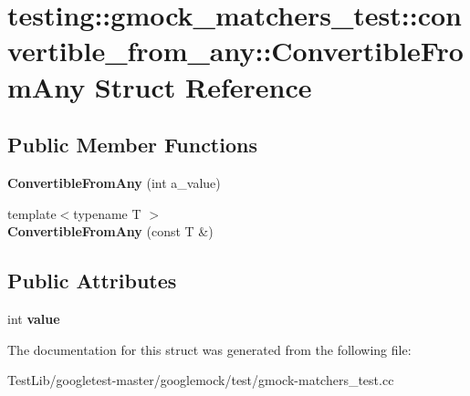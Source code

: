 \hypertarget{structtesting_1_1gmock__matchers__test_1_1convertible__from__any_1_1ConvertibleFromAny}{}\section{testing\+:\+:gmock\+\_\+matchers\+\_\+test\+:\+:convertible\+\_\+from\+\_\+any\+:\+:Convertible\+From\+Any Struct Reference}
\label{structtesting_1_1gmock__matchers__test_1_1convertible__from__any_1_1ConvertibleFromAny}
\subsection*{Public Member Functions}
\begin{DoxyCompactItemize}
\item 
\mbox{\label{structtesting_1_1gmock__matchers__test_1_1convertible__from__any_1_1ConvertibleFromAny_a5bee1e70fa860c1219928f82006e2b2b}} 
{\bfseries Convertible\+From\+Any} (int a\+\_\+value)
\item 
\mbox{\label{structtesting_1_1gmock__matchers__test_1_1convertible__from__any_1_1ConvertibleFromAny_a1192b2a272c6ce8e6fc75a9448417a4f}} 
{\footnotesize template$<$typename T $>$ }\\{\bfseries Convertible\+From\+Any} (const T \&)
\end{DoxyCompactItemize}
\subsection*{Public Attributes}
\begin{DoxyCompactItemize}
\item 
\mbox{\label{structtesting_1_1gmock__matchers__test_1_1convertible__from__any_1_1ConvertibleFromAny_a4fdd0c9f00eced05d2af01b3cf28889f}} 
int {\bfseries value}
\end{DoxyCompactItemize}


The documentation for this struct was generated from the following file\+:\begin{DoxyCompactItemize}
\item 
Test\+Lib/googletest-\/master/googlemock/test/gmock-\/matchers\+\_\+test.\+cc\end{DoxyCompactItemize}
